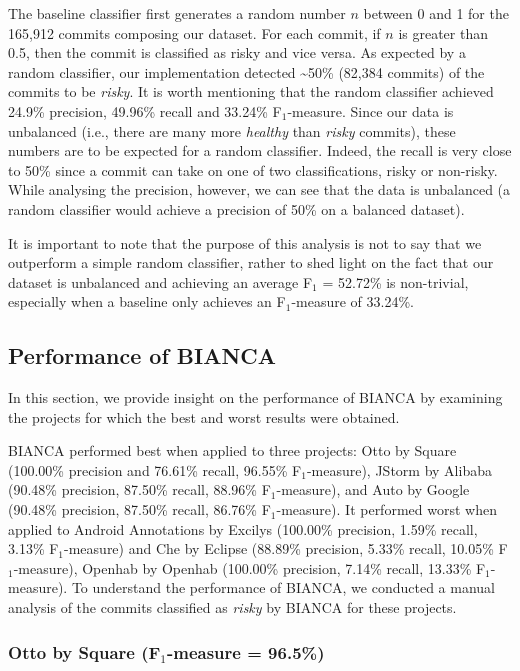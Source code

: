 \documentclass[12pt]{report}
\begin{document}
The baseline classifier first generates a random number \(n\) between 0
and 1 for the 165,912 commits composing our dataset. For each commit, if
\(n\) is greater than 0.5, then the commit is classified as risky and
vice versa. As expected by a random classifier, our implementation
detected \textasciitilde{}50\% (82,384 commits) of the commits to be
\emph{risky}. It is worth mentioning that the random classifier achieved
24.9\% precision, 49.96\% recall and 33.24\% F\(_1\)-measure. Since our
data is unbalanced (i.e., there are many more \emph{healthy} than
\emph{risky} commits), these numbers are to be expected for a random
classifier. Indeed, the recall is very close to 50\% since a commit can
take on one of two classifications, risky or non-risky. While analysing
the precision, however, we can see that the data is unbalanced (a random
classifier would achieve a precision of 50\% on a balanced dataset).

It is important to note that the purpose of this analysis is not to say
that we outperform a simple random classifier, rather to shed light on
the fact that our dataset is unbalanced and achieving an average F\(_1\)
= 52.72\% is non-trivial, especially when a baseline only achieves an
F\(_1\)-measure of 33.24\%.

\subsection{Performance of BIANCA}\label{performance-of-bianca}

In this section, we provide insight on the performance of BIANCA by
examining the projects for which the best and worst results were
obtained.

BIANCA performed best when applied to three projects: Otto by Square
(100.00\% precision and 76.61\% recall, 96.55\% F\(_1\)-measure), JStorm
by Alibaba (90.48\% precision, 87.50\% recall, 88.96\% F\(_1\)-measure),
and Auto by Google (90.48\% precision, 87.50\% recall, 86.76\%
F\(_1\)-measure). It performed worst when applied to Android Annotations
by Excilys (100.00\% precision, 1.59\% recall, 3.13\% F\(_1\)-measure)
and Che by Eclipse (88.89\% precision, 5.33\% recall, 10.05\%
F\(_1\)-measure), Openhab by Openhab (100.00\% precision, 7.14\% recall,
13.33\% F\(_1\)-measure). To understand the performance of BIANCA, we
conducted a manual analysis of the commits classified as \emph{risky} by
BIANCA for these projects.

\subsubsection{\texorpdfstring{Otto by Square (F\(_1\)-measure =
96.5\%)}{Otto by Square (F\_1-measure = 96.5\%)}}\label{otto-by-square-fux5f1-measure-96.5}
\end{document}
